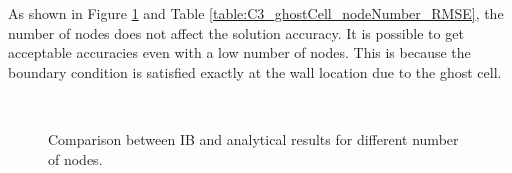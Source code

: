 As shown in Figure \ref{fig:C3_ghostCell_nodeNumber} and Table \ref{table:C3_ghostCell_nodeNumber_RMSE}, the number of nodes does not affect the solution accuracy. It is possible to get acceptable accuracies even with a low number of nodes. This is because the boundary condition is satisfied exactly at the wall location due to the ghost cell.
%
\begin{figure}[H]
    \centering
    \quad
    \\
    \quad
    \caption{Comparison between IB and analytical results for different number of nodes.}
    \label{fig:C3_ghostCell_nodeNumber}
\end{figure}
